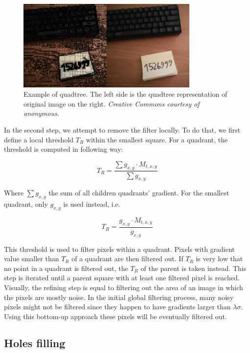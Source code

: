 \documentclass[pdftex,12pt,a4paper]{report}
\begin{document}
\begin{figure}[H]
\centering
\includegraphics[width=0.8\textwidth]{images/quadtree}
\caption[Example of quadtree]{Example of quadtree. The left side is the quadtree representation of original image on the right. \textit{Creative Commons courtesy of anonymous.}}
\label{fig:quadtree}
\end{figure}

In the second step, we attempt to remove the filter locally. To do that, we first define a local threshold $T_R$ within the smallest square. For a quadrant, the threshold is computed in following way:

\begin{equation}
T_R = \frac{\sum g_{x,y} \cdot M_{t, x, y}}{\sum g_{x, y}}
\label{eq:local_threshold_rats}
\end{equation}

Where $\sum g_{x,y}$ the sum of all children quadrants' gradient. For the smallest quadrant, only $g_{x,y}$ is used instead, i.e.

\begin{equation}
T_R = \frac{g_{x,y} \cdot M_{t, x, y}}{g_{x, y}}
\label{eq:local_threshold_rats_smallest}
\end{equation}

This threshold is used to filter pixels within a quadrant. Pixels with gradient value smaller than $T_R$ of a quadrant are then filtered out. If $T_R$ is very low that no point in a quadrant is filtered out, the $T_R$ of the parent is taken instead. This step is iterated until a parent square with at least one filtered pixel is reached. Visually, the refining step is equal to filtering out the area of an image in which the pixels are mostly noise. In the initial global filtering process, many noisy pixels might not be filtered since they happen to have gradients larger than $\lambda \sigma$. Using this bottom-up approach these pixels will be eventually filtered out.

\subsection{Holes filling}
\label{subsection:holes_filling}
\end{document}
